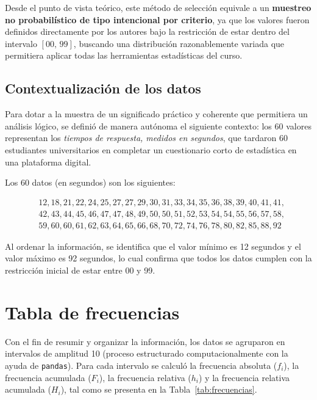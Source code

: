 \documentclass[12pt,letterpaper]{article}
\begin{document}
Desde el punto de vista teórico, este método de selección equivale a un
\textbf{muestreo no probabilístico de tipo intencional por criterio}, ya que los
valores fueron definidos directamente por los autores bajo la restricción de estar
dentro del intervalo $[00,\, 99]$, buscando una distribución razonablemente variada
que permitiera aplicar todas las herramientas estadísticas del curso.

\subsection{Contextualización de los datos}

Para dotar a la muestra de un significado práctico y coherente que permitiera un
análisis lógico, se definió de manera autónoma el siguiente contexto: los 60 valores
representan los \textit{tiempos de respuesta, medidos en segundos}, que tardaron 60
estudiantes universitarios en completar un cuestionario corto de estadística en una
plataforma digital.

Los 60 datos (en segundos) son los siguientes:

\begin{align*}
&12, 18, 21, 22, 24, 25, 27, 27, 29, 30, 31, 33, 34, 35, 36, 38, 39, 40, 41, 41, \\
&42, 43, 44, 45, 46, 47, 47, 48, 49, 50, 50, 51, 52, 53, 54, 54, 55, 56, 57, 58, \\
&59, 60, 60, 61, 62, 63, 64, 65, 66, 68, 70, 72, 74, 76, 78, 80, 82, 85, 88, 92
\end{align*}

Al ordenar la información, se identifica que el valor mínimo es 12 segundos y el
valor máximo es 92 segundos, lo cual confirma que todos los datos cumplen con la
restricción inicial de estar entre 00 y 99.

\section{Tabla de frecuencias}

Con el fin de resumir y organizar la información, los datos se agruparon en intervalos de amplitud 10 (proceso estructurado computacionalmente con la ayuda de \texttt{pandas}). Para cada intervalo se calculó la frecuencia absoluta ($f_i$), la frecuencia acumulada ($F_i$), la frecuencia relativa ($h_i$) y la frecuencia relativa acumulada ($H_i$), tal como se presenta en la Tabla~\ref{tab:frecuencias}.
\end{document}
